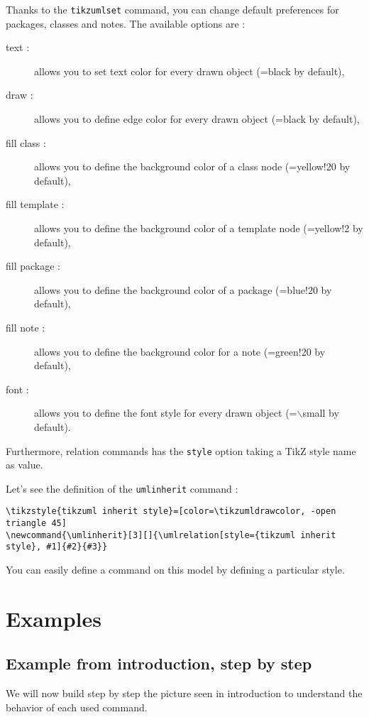 \documentclass[a4paper,11pt]{report}
\newcommand{\TikZ}{{\sc TikZ} \xspace}
\begin{document}
Thanks to the {\tt tikzumlset} command, you can change default preferences for packages, classes and notes. The available options are :

\begin{description}
\item[text : ] allows you to set text color for every drawn object (=black by default),
\item[draw :] allows you to define edge color for every drawn object (=black by default),
\item[fill class :] allows you to define the background color of a class node (=yellow!20 by default),
\item[fill template :] allows you to define the background color of a template node (=yellow!2 by default),
\item[fill package :] allows you to define the background color of a package (=blue!20 by default),
\item[fill note :] allows you to define the background color for a note (=green!20 by default),
\item[font :] allows you to define the font style for every drawn object (=$\backslash$small by default).
\end{description}

Furthermore, relation commands has the {\tt style} option taking a \TikZ style name as value.

Let's see the definition of the {\tt umlinherit} command :

\begin{lstlisting}
\tikzstyle{tikzuml inherit style}=[color=\tikzumldrawcolor, -open triangle 45]
\newcommand{\umlinherit}[3][]{\umlrelation[style={tikzuml inherit style}, #1]{#2}{#3}}
\end{lstlisting}

You can easily define a command on this model by defining a particular style.

\section{Examples}

\subsection{Example from introduction, step by step}

We will now build step by step the picture seen in introduction to understand the behavior of each used command.
\end{document}
